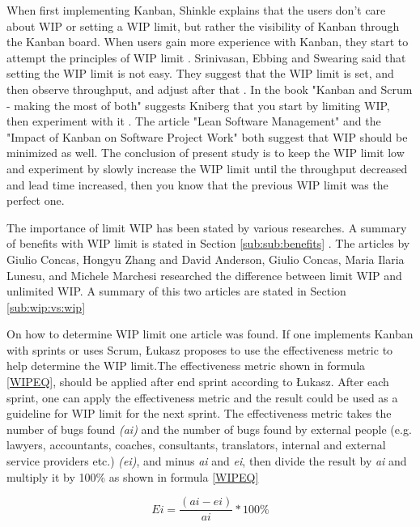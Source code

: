 \documentclass[UKenglish]{ifimaster}  %
\begin{document}
When first implementing Kanban, Shinkle explains that the users don't care about WIP or setting a WIP limit, but rather the visibility of Kanban through the Kanban board. When users gain more experience with Kanban, they start to attempt the principles of WIP limit \parencite{Shinkle}. Srinivasan, Ebbing and Swearing said that setting the WIP limit is not easy. They suggest that the WIP limit is set, and then observe throughput, and adjust after that \parencite{Mandyam}. In the book "Kanban and Scrum - making the most of both" suggests Kniberg that you start by limiting WIP, then experiment with it \parencite{Kniberg}. The article "Lean Software Management" \parencite{Kniberg} and the "Impact of Kanban on Software Project Work" \parencite{Ikonen} both suggest that WIP should be minimized as well. The conclusion of present study is to keep the WIP limit low and experiment by slowly increase the WIP limit until the throughput decreased and lead time increased, then you know that the previous WIP limit was the perfect one.

The importance of limit WIP has been stated by various researches. A summary of benefits with WIP limit is stated in Section \ref{sub:sub:benefits} .  The articles by Giulio Concas, Hongyu Zhang \parencite{SMR:SMR1599}  and David Anderson, Giulio Concas, Maria Ilaria Lunesu, and Michele Marchesi \parencite{DavidAnderson} researched the difference between limit WIP and unlimited WIP.  A summary of this two articles are stated in Section \ref{sub:wip:vs:wip}

On how to determine WIP limit one article was found. If one implements Kanban with sprints or uses Scrum, \L ukasz proposes to use the effectiveness metric to help determine the WIP limit.The effectiveness metric shown in formula \ref{WIPEQ}, should be applied after end sprint according to \L ukasz. After each sprint, one can apply the effectiveness metric and the result could be used as a guideline for WIP limit for the next sprint. The effectiveness metric takes the number of bugs found \textit{(ai)} and the number of bugs found by external people (e.g. lawyers, accountants, coaches, consultants, translators, internal and external service providers etc.) \textit{(ei)}, and minus \textit{ai} and \textit{ei}, then divide the result by \textit{ai} and multiply it by 100\%  as shown in formula \ref{WIPEQ} \parencite{Sienkiewicz}

\begin{equation} \label{WIPEQ}
Ei=\frac{(ai-ei)}{ai}*100\%
\end{equation}
\end{document}
